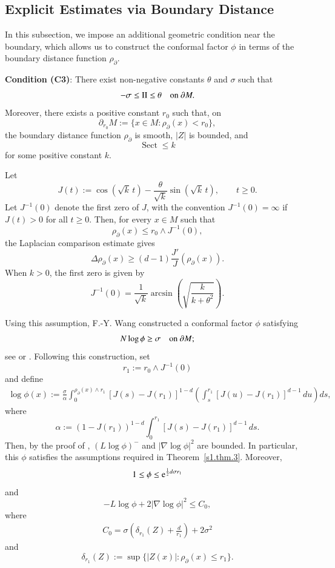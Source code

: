 \documentclass[11pt,twoside, reqno]{article}
\def\e{{\rm e}}
\newcommand\1{\mathbbm{1}}
\newcommand\II{\mathrm{II}}
\theoremstyle{definition}
\numberwithin{equation}{section}
\def \e{{\rm e}}
\begin{document}
\subsection{Explicit Estimates via Boundary Distance}

In this subsection, we impose an additional geometric condition near the
boundary, which allows us to construct the conformal factor \(\phi\) in terms
of the boundary distance function \(\rho_{\partial}\).

\begin{mdframed}
\textbf{Condition (C3)}: There exist non-negative constants \(\theta\) and
\(\sigma\) such that
\[
        -\sigma\leq \II\leq \theta
        \quad \hbox{on } \partial M .
\]
Moreover, there exists a positive constant \(r_0\) such that, on
\[
        \partial_{r_0}M:=\{x\in M:\rho_{\partial}(x)<r_0\},
\]
the boundary distance function \(\rho_{\partial}\) is smooth, \(|Z|\) is
bounded, and
\[
        \operatorname{Sect}\leq k
\]
for some positive constant \(k\).
\end{mdframed}

Let
\[
        J(t):=
        \cos(\sqrt{k}\,t)
        -
        \frac{\theta}{\sqrt{k}}\sin(\sqrt{k}\,t),
        \qquad t\geq0.
\]
Let \(J^{-1}(0)\) denote the first zero of \(J\), with the convention
\(J^{-1}(0)=\infty\) if \(J(t)>0\) for all \(t\geq0\). Then, for every
\(x\in M\) such that
\[
        \rho_{\partial}(x)\leq r_0\wedge J^{-1}(0),
\]
the Laplacian comparison estimate gives
\[
        \Delta\rho_{\partial}(x)
        \geq
        (d-1)\frac{J'}{J}(\rho_{\partial}(x)).
\]
When \(k>0\), the first zero is given by
\[
        J^{-1}(0)
        =
        \frac1{\sqrt{k}}
        \arcsin\left(\sqrt{\frac{k}{k+\theta^2}}\right).
\]

Using this assumption, F.-Y. Wang constructed a conformal factor \(\phi\)
satisfying
\[
        N\log\phi\geq \sigma
        \quad \hbox{on } \partial M;
\]
see \cite{Wang:2007} or \cite[Theorem~3.2.9]{Wbook14}. Following this
construction, set
\[
        r_1:=r_0\wedge J^{-1}(0)
\]
and define
\[
\begin{aligned}
\log \phi(x)
:=
\frac{\sigma}{\alpha}
\int_{0}^{\rho_{\partial}(x)\wedge r_1}
[J(s)-J(r_1)]^{1-d}
\left(
\int_{s}^{r_1}
[J(u)-J(r_1)]^{d-1}\,du
\right)ds,
\end{aligned}
\]
where
\[
        \alpha:=
        (1-J(r_1))^{1-d}
        \int_0^{r_1}
        [J(s)-J(r_1)]^{d-1}\,ds .
\]
Then, by the proof of \cite[Theorem~1.1]{wang2005functional},
\((L\log\phi)^-\) and \(|\nabla\log\phi|^2\) are bounded. In particular,
this \(\phi\) satisfies the assumptions required in
Theorem~\ref{s1.thm.3}. Moreover,
\[
        1\leq \phi\leq \e^{\frac12 d\sigma r_1}
\]
and
\[
        -L\log\phi+2|\nabla\log\phi|^2\leq C_0,
\]
where
\begin{align}\label{def-C0}
        C_0=
        \sigma\left(\delta_{r_1}(Z)+\frac{d}{r_1}\right)+2\sigma^2
\end{align}
and
\[
        \delta_{r_1}(Z)
        :=
        \sup\{|Z(x)|:\rho_{\partial}(x)\leq r_1\}.
\]
\end{document}

